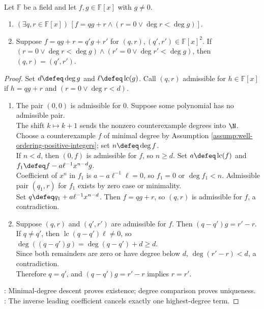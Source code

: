 \begin{theorem} \label{thm:polynomial-division-algorithm} \\
Let $\mathbb{F}$ be a field and let $f,g\in\mathbb{F}[x]$ with $g\neq0$.
\begin{enumerate}[label=(\roman*)]
\setlength{\itemsep}{0pt}
\item $(\exists q,r\in\mathbb{F}[x])\,[f=qg+r\land(r=0\lor\deg r<\deg g)]$.
\item Suppose $f=qg+r=q'g+r'$ for $(q,r),(q',r')\in\mathbb{F}[x]^2$. If $(r=0\lor\deg r<\deg g)\land(r'=0\lor\deg r'<\deg g)$, then $(q,r)=(q',r')$.
\end{enumerate}
\begin{proof}
Set $d\defeq\deg g$ and $\ell\defeq\operatorname{lc}(g)$. Call $(q,r)$ admissible for $h\in\mathbb{F}[x]$ if $h=qg+r$ and $(r=0\lor\deg r<d)$.
\begin{enumerate}[label=(\roman*)]
\setlength{\itemsep}{0pt}
\item The pair $(0,0)$ is admissible for $0$. Suppose some polynomial has no admissible pair.\\
The shift $k\mapsto k+1$ sends the nonzero counterexample degrees into $\N$.\\
Choose a counterexample $f$ of minimal degree by Assumption \ref{assump:well-ordering-positive-integers}; set $n\defeq\deg f$.\\
If $n<d$, then $(0,f)$ is admissible for $f$, so $n\geq d$. Set $a\defeq\operatorname{lc}(f)$ and $f_1\defeq f-a\ell^{-1}x^{n-d}g$.\\
Coefficient of $x^n$ in $f_1$ is $a-a\ell^{-1}\ell=0$, so $f_1=0$ or $\deg f_1<n$. Admissible pair $(q_1,r)$ for $f_1$ exists by zero case or minimality.\\
Set $q\defeq q_1+a\ell^{-1}x^{n-d}$. Then $f=qg+r$, so $(q,r)$ is admissible for $f$, a contradiction.
\item Suppose $(q,r)$ and $(q',r')$ are admissible for $f$. Then $(q-q')g=r'-r$.\\
If $q\neq q'$, then $\operatorname{lc}(q-q')\ell\neq0$, so $\deg((q-q')g)=\deg(q-q')+d\geq d$.\\
Since both remainders are zero or have degree below $d$, $\deg(r'-r)<d$, a contradiction.\\
Therefore $q=q'$, and $(q-q')g=r'-r$ implies $r=r'$.
\end{enumerate}
: Minimal-degree descent proves existence; degree comparison proves uniqueness.\\
: The inverse leading coefficient cancels exactly one highest-degree term.
\end{proof}
\end{theorem}


